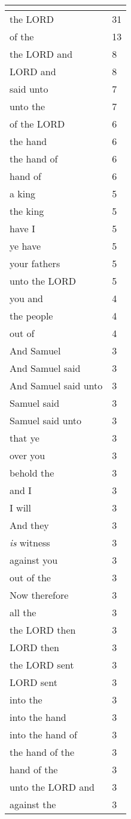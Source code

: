 \begin{center}
\begin{longtable}{|p{3.0in}|p{0.5in}|}
\hline \multicolumn{2}{c}{{ }} \\ \hline
\endfoot 
the LORD & 31\\ \hline 
of the & 13\\ \hline 
the LORD and & 8\\ \hline 
LORD and & 8\\ \hline 
said unto & 7\\ \hline 
unto the & 7\\ \hline 
of the LORD & 6\\ \hline 
the hand & 6\\ \hline 
the hand of & 6\\ \hline 
hand of & 6\\ \hline 
a king & 5\\ \hline 
the king & 5\\ \hline 
have I & 5\\ \hline 
ye have & 5\\ \hline 
your fathers & 5\\ \hline 
unto the LORD & 5\\ \hline 
you and & 4\\ \hline 
the people & 4\\ \hline 
out of & 4\\ \hline 
And Samuel & 3\\ \hline 
And Samuel said & 3\\ \hline 
And Samuel said unto & 3\\ \hline 
Samuel said & 3\\ \hline 
Samuel said unto & 3\\ \hline 
that ye & 3\\ \hline 
over you & 3\\ \hline 
behold the & 3\\ \hline 
and I & 3\\ \hline 
I will & 3\\ \hline 
And they & 3\\ \hline 
\emph{is} witness & 3\\ \hline 
against you & 3\\ \hline 
out of the & 3\\ \hline 
Now therefore & 3\\ \hline 
all the & 3\\ \hline 
the LORD then & 3\\ \hline 
LORD then & 3\\ \hline 
the LORD sent & 3\\ \hline 
LORD sent & 3\\ \hline 
into the & 3\\ \hline 
into the hand & 3\\ \hline 
into the hand of & 3\\ \hline 
the hand of the & 3\\ \hline 
hand of the & 3\\ \hline 
unto the LORD and & 3\\ \hline 
against the & 3\\ \hline 
\end{longtable}
\end{center}





